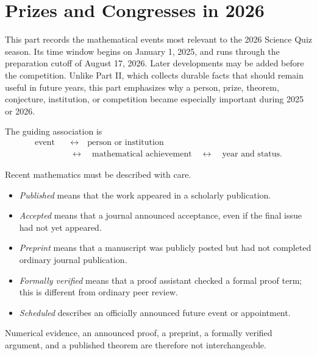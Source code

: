     \chapter{Prizes and Congresses in 2026}

    This part records the mathematical events most relevant to the 2026
    Science Quiz season. Its time window begins on January 1, 2025, and runs
    through the preparation cutoff of August 17, 2026. Later developments may be
    added before the competition. Unlike Part II, which collects durable facts
    that should remain useful in future years, this part emphasizes why a
    person, prize, theorem, conjecture, institution, or competition became
    especially important during 2025 or 2026.

    The guiding association is
    \[
        \begin{aligned}
            \text{event}
            &\quad\longleftrightarrow\quad
            \text{person or institution}\\
            &\quad\longleftrightarrow\quad
            \text{mathematical achievement}
            \quad\longleftrightarrow\quad
            \text{year and status}.
        \end{aligned}
    \]

    \begin{fact}
        Recent mathematics must be described with care.
        \begin{itemize}
            \item \emph{Published} means that the work appeared in a scholarly
                  publication.
            \item \emph{Accepted} means that a journal announced acceptance, even
                  if the final issue had not yet appeared.
            \item \emph{Preprint} means that a manuscript was publicly posted but
                  had not completed ordinary journal publication.
            \item \emph{Formally verified} means that a proof assistant checked a
                  formal proof term; this is different from ordinary peer review.
            \item \emph{Scheduled} describes an officially announced future event
                  or appointment.
        \end{itemize}
        Numerical evidence, an announced proof, a preprint, a formally verified
        argument, and a published theorem are therefore not interchangeable.
    \end{fact}


